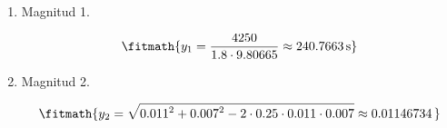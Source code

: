 \begin{enumerate}

\item Magnitud 1.

\[\fitmath{y_{1}=\frac{4250}{1.8\cdot 9.80665}\approx 240.7663\,\mathrm{s}}\]

\item Magnitud 2.

\[\fitmath{y_{2}=\sqrt{{0.011}^{2}+{0.007}^{2}-2\cdot 0.25\cdot 0.011\cdot 0.007}\approx 0.01146734\,}\]

\end{enumerate}

